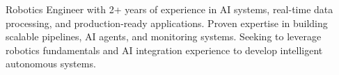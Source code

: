 \documentclass[letter,10pt]{article}
\begin{document}
Robotics Engineer with 2+ years of experience in AI systems, real-time data processing, and production-ready applications. Proven expertise in building scalable pipelines, AI agents, and monitoring systems. Seeking to leverage robotics fundamentals and AI integration experience to develop intelligent autonomous systems.
\end{document}
